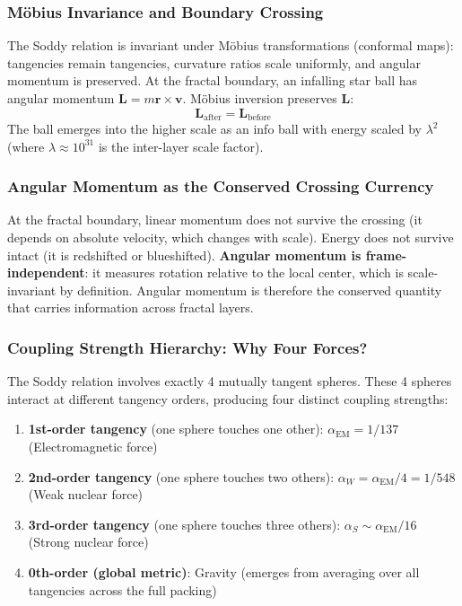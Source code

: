 \documentclass[11pt,a4paper]{article}
\begin{document}
\subsubsection{M\"obius Invariance and Boundary Crossing}

The Soddy relation is invariant under M\"obius transformations (conformal maps):
tangencies remain tangencies, curvature ratios scale uniformly, and angular
momentum is preserved. At the fractal boundary, an infalling star ball has angular
momentum $\mathbf{L} = m\mathbf{r}\times\mathbf{v}$. M\"obius inversion preserves
$\mathbf{L}$:
\[
  \mathbf{L}_{\text{after}} = \mathbf{L}_{\text{before}}
\]
The ball emerges into the higher scale as an info ball with energy scaled by
$\lambda^2$ (where $\lambda \approx 10^{31}$ is the inter-layer scale factor).

\subsubsection{Angular Momentum as the Conserved Crossing Currency}

At the fractal boundary, linear momentum does not survive the crossing (it depends
on absolute velocity, which changes with scale). Energy does not survive intact (it
is redshifted or blueshifted). \textbf{Angular momentum is frame-independent}: it
measures rotation relative to the local center, which is scale-invariant by
definition. Angular momentum is therefore the conserved quantity that carries
information across fractal layers.

\subsubsection{Coupling Strength Hierarchy: Why Four Forces?}

The Soddy relation involves exactly 4 mutually tangent spheres. These 4 spheres
interact at different tangency orders, producing four distinct coupling strengths:
\begin{enumerate}
  \item \textbf{1st-order tangency} (one sphere touches one other):
        $\alpha_{\text{EM}} = 1/137$ \quad (Electromagnetic force)
  \item \textbf{2nd-order tangency} (one sphere touches two others):
        $\alpha_W = \alpha_{\text{EM}}/4 = 1/548$ \quad (Weak nuclear force)
  \item \textbf{3rd-order tangency} (one sphere touches three others):
        $\alpha_S \sim \alpha_{\text{EM}}/16$ \quad (Strong nuclear force)
  \item \textbf{0th-order (global metric)}: Gravity (emerges from averaging over
        all tangencies across the full packing)
\end{enumerate}
\end{document}
